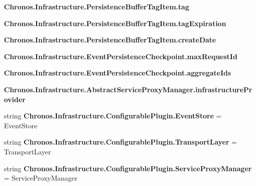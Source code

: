 \begin{DoxyCompactItemize}
\item 
{\bfseries Chronos.\+Infrastructure.\+Persistence\+Buffer\+Tag\+Item.\+tag}\hypertarget{group__Chronos_ga8dad05d80a900bb1a862dacc2fa2f3fc}{}\label{group__Chronos_ga8dad05d80a900bb1a862dacc2fa2f3fc}

\item 
{\bfseries Chronos.\+Infrastructure.\+Persistence\+Buffer\+Tag\+Item.\+tag\+Expiration}\hypertarget{group__Chronos_ga7094d1c2f7d099c854671efa4091eedd}{}\label{group__Chronos_ga7094d1c2f7d099c854671efa4091eedd}

\item 
{\bfseries Chronos.\+Infrastructure.\+Persistence\+Buffer\+Tag\+Item.\+create\+Date}\hypertarget{group__Chronos_ga6db31ffb46e794a71a9d82b88f60c9b5}{}\label{group__Chronos_ga6db31ffb46e794a71a9d82b88f60c9b5}

\item 
{\bfseries Chronos.\+Infrastructure.\+Event\+Persistence\+Checkpoint.\+max\+Request\+Id}\hypertarget{group__Chronos_ga6019ba7ff4c357e63ccd97b0d61437a6}{}\label{group__Chronos_ga6019ba7ff4c357e63ccd97b0d61437a6}

\item 
{\bfseries Chronos.\+Infrastructure.\+Event\+Persistence\+Checkpoint.\+aggregate\+Ids}\hypertarget{group__Chronos_ga511474b58ea8c91e358a0351e780c68a}{}\label{group__Chronos_ga511474b58ea8c91e358a0351e780c68a}

\item 
{\bfseries Chronos.\+Infrastructure.\+Abstract\+Service\+Proxy\+Manager.\+infrastructure\+Provider}\hypertarget{group__Chronos_gaab9d7cdfff03b229756e36e9886fa027}{}\label{group__Chronos_gaab9d7cdfff03b229756e36e9886fa027}

\item 
string {\bfseries Chronos.\+Infrastructure.\+Configurable\+Plugin.\+Event\+Store} = \textquotesingle{}Event\+Store\textquotesingle{}\hypertarget{group__Chronos_ga4db109748bd794229cf95557617c7881}{}\label{group__Chronos_ga4db109748bd794229cf95557617c7881}

\item 
string {\bfseries Chronos.\+Infrastructure.\+Configurable\+Plugin.\+Transport\+Layer} = \textquotesingle{}Transport\+Layer\textquotesingle{}\hypertarget{group__Chronos_gaf719756de22d1a602f6f9b90d92f3cff}{}\label{group__Chronos_gaf719756de22d1a602f6f9b90d92f3cff}

\item 
string {\bfseries Chronos.\+Infrastructure.\+Configurable\+Plugin.\+Service\+Proxy\+Manager} = \textquotesingle{}Service\+Proxy\+Manager\textquotesingle{}\hypertarget{group__Chronos_ga52b49e3b513c9f89b81abbf66df9cb6b}{}\label{group__Chronos_ga52b49e3b513c9f89b81abbf66df9cb6b}


\end{DoxyCompactItemize}
